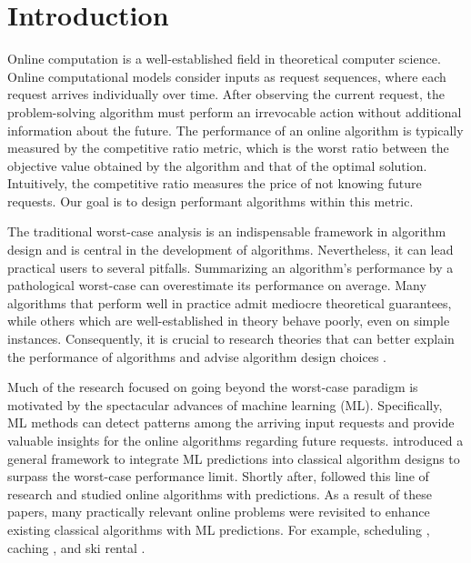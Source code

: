 
\section{Introduction}

Online computation \cite{BorodinEl-Yaniv05:Online-computation} is a well-established field in theoretical computer science. Online computational models consider inputs as request sequences, where each request arrives individually over time. After observing the current request, the problem-solving algorithm must perform an irrevocable action without additional information about the future. The performance of an online algorithm is typically measured by the competitive ratio metric, which is the worst ratio between the objective value obtained by the algorithm and that of the optimal solution. Intuitively, the competitive ratio measures the price of not knowing future requests. Our goal is to design performant algorithms within this metric.

The traditional worst-case analysis is an indispensable framework in algorithm design and is central in the development of algorithms. Nevertheless, it can lead practical users to several pitfalls. Summarizing an algorithm's performance by a pathological worst-case can overestimate its performance on average. Many algorithms that perform well in practice admit mediocre theoretical guarantees, while others which are well-established in theory behave poorly, even on simple instances. Consequently, it is crucial to research theories that can better explain the performance of algorithms and advise algorithm design choices \cite{Roughgarden19:Beyond-worst-case,Roughgarden20:Beyond-the-Worst-Case}.

Much of the research focused on going beyond the worst-case paradigm is motivated by the spectacular advances of machine learning (ML). Specifically, ML methods can detect patterns among the arriving input requests and provide valuable insights for the online algorithms regarding future requests. \cite{LykourisVassilvtiskii18:Competitive-caching} introduced a general framework to integrate ML predictions into classical algorithm designs to surpass the worst-case performance limit.
Shortly after, \cite{MitzenmacherVassilvitskii20:Beyond-the-Worst-Case}
followed this line of research and studied online algorithms with predictions. As a result of these papers, many practically relevant online problems were revisited to enhance existing classical algorithms with ML predictions. For example, scheduling \cite{LattanziLavastida20:Online-scheduling,Mitzenmacher20:Scheduling-with}, caching \cite{LykourisVassilvtiskii18:Competitive-caching,Rohatgi20:Near-optimal-bounds,AntoniadisCoester20:Online-metric}, and ski rental \cite{GollapudiPanigrahi19:Online-algorithms,KumarPurohit18:Improving-online}.

